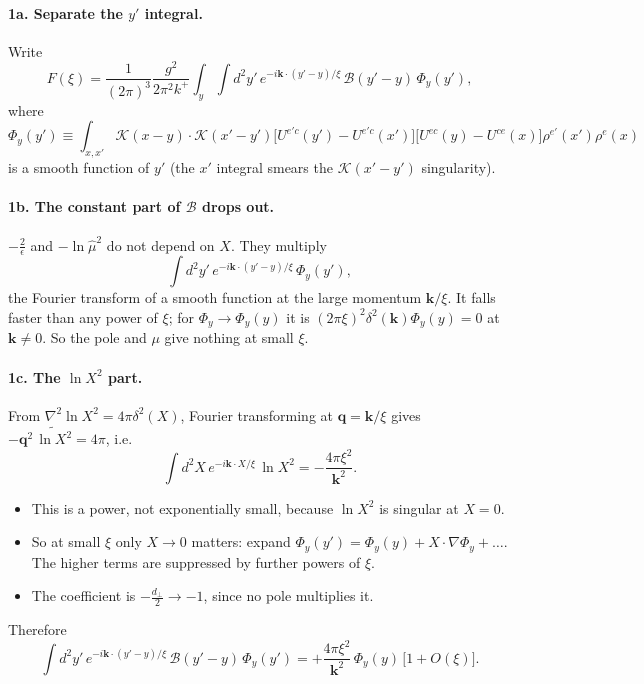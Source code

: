 \documentclass[10pt]{article}
\numberwithin{equation}{section}
\begin{document}
\paragraph{1a. Separate the $y'$ integral.} Write
\begin{equation}
F(\xi)=\frac{1}{(2\pi)^{3}}\frac{g^{2}}{2\pi^{2}k^{+}}\int_y\int d^2y'\,e^{-i\mathbf k\cdot(y'-y)/\xi}\,\mathcal B(y'-y)\,\Phi_y(y'),
\end{equation}
where
\begin{equation}
\Phi_y(y')\equiv\int_{x,x'}\mathcal K(x-y)\cdot\mathcal K(x'-y')\big[U^{e'c}(y')-U^{e'c}(x')\big]\big[U^{ec}(y)-U^{ce}(x)\big]\rho^{e'}(x')\rho^{e}(x)
\end{equation}
is a smooth function of $y'$ (the $x'$ integral smears the $\mathcal K(x'-y')$ singularity).

\paragraph{1b. The constant part of $\mathcal B$ drops out.} $-\frac2\epsilon$ and $-\ln\hat\mu^2$ do not depend on $X$. They multiply
\begin{equation}
\int d^2y'\,e^{-i\mathbf k\cdot(y'-y)/\xi}\,\Phi_y(y'),
\end{equation}
the Fourier transform of a smooth function at the large momentum $\mathbf k/\xi$. It falls faster than any power of $\xi$; for $\Phi_y\to\Phi_y(y)$ it is $(2\pi\xi)^2\delta^2(\mathbf k)\Phi_y(y)=0$ at $\mathbf k\neq0$. So the pole and $\mu$ give nothing at small $\xi$.

\paragraph{1c. The $\ln X^2$ part.} From $\nabla^2\ln X^2=4\pi\delta^2(X)$, Fourier transforming at $\mathbf q=\mathbf k/\xi$ gives $-\mathbf q^2\,\widetilde{\ln X^2}=4\pi$, i.e.
\begin{equation}
\int d^2X\,e^{-i\mathbf k\cdot X/\xi}\,\ln X^2=-\frac{4\pi\xi^2}{\mathbf k^2}.
\end{equation}
\begin{itemize}
\item This is a power, not exponentially small, because $\ln X^2$ is singular at $X=0$.
\item So at small $\xi$ only $X\to0$ matters: expand $\Phi_y(y')=\Phi_y(y)+X\cdot\nabla\Phi_y+\dots$. The higher terms are suppressed by further powers of $\xi$.
\item The coefficient is $-\frac{d_\perp}{2}\to-1$, since no pole multiplies it.
\end{itemize}
Therefore
\begin{equation}
\int d^2y'\,e^{-i\mathbf k\cdot(y'-y)/\xi}\,\mathcal B(y'-y)\,\Phi_y(y')=+\frac{4\pi\xi^2}{\mathbf k^2}\,\Phi_y(y)\,\big[1+O(\xi)\big].
\end{equation}
\end{document}
